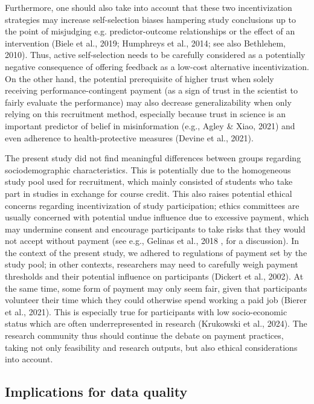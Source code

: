 \documentclass[authordate, empirical]{jote-new-article}
\begin{document}
	Furthermore, one should also take into account that these two incentivization strategies may increase self-selection biases hampering study conclusions up to the point of misjudging e.g. predictor-outcome relationships or the effect of an intervention (Biele et al., 2019; Humphreys et al., 2014; see also Bethlehem, 2010). Thus, active self-selection needs to be carefully considered as a potentially negative consequence of offering feedback as a low-cost alternative incentivization. On the other hand, the potential prerequisite of higher trust when solely receiving performance-contingent payment (as a sign of trust in the scientist to fairly evaluate the performance) may also decrease generalizability when only relying on this recruitment method, especially because trust in science is an important predictor of belief in misinformation (e.g., Agley \& Xiao, 2021) and even adherence to health-protective measures (Devine et al., 2021).



	The present study did not find meaningful differences between groups regarding sociodemographic characteristics. This is potentially due to the homogeneous study pool used for recruitment, which mainly consisted of students who take part in studies in exchange for course credit. This also raises potential ethical concerns regarding incentivization of study participation; ethics committees are usually concerned with potential undue influence due to excessive payment, which may undermine consent and encourage participants to take risks that they would not accept without payment (see e.g., Gelinas et al., 2018 , for a discussion). In the context of the present study, we adhered to regulations of payment set by the study pool; in other contexts, researchers may need to carefully weigh payment thresholds and their potential influence on participants (Dickert et al., 2002). At the same time, some form of payment may only seem fair, given that participants volunteer their time which they could otherwise spend working a paid job (Bierer et al., 2021). This is especially true for participants with low socio-economic status which are often underrepresented in research (Krukowski et al., 2024). The research community thus should continue the debate on payment practices, taking not only feasibility and research outputs, but also ethical considerations into account.



	\subsection{Implications for data quality}
\end{document}

